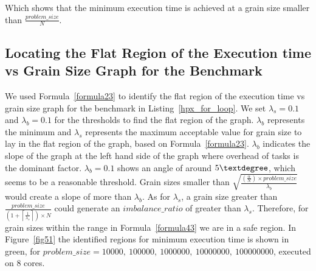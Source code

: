 Which shows that the minimum execution time is achieved at a grain size smaller than $\frac{problem\_{size}}{N}$.
 

\subsection{Locating the Flat Region of the Execution time vs Grain Size Graph for the Benchmark}

We used Formula~\ref{formula23} to identify the flat region of the execution time vs grain size graph for the benchmark in Listing~\ref{hpx_for_loop}. We set $\lambda_{s}=0.1$ and $\lambda_{b}=0.1$ for the thresholds to find the flat region of the graph. $\lambda_{b}$ represents the minimum and $\lambda_{s}$ represents the maximum acceptable value for grain size to lay in the flat region of the graph, based on Formula~\ref{formula23}. $\lambda_{b}$ indicates the slope of the graph at the left hand side of the graph where overhead of tasks is the dominant factor. $\lambda_{b}=0.1$ shows an angle of around $5\textdegree$, which seems to be a reasonable threshold. Grain sizes smaller than $\sqrt{\frac{(\frac{\alpha}{N})\times{problem\_{size}}}{{\lambda_b}}}$ would create a slope of more than $\lambda_b$. As for $\lambda_s$, a grain size greater than       
$\frac{problem\_{size}}{(1+\left\lceil{\frac{1}{\lambda_s}}\right\rceil)\times{N}}$ could generate an $imbalance\_{ratio}$ of greater than $\lambda_s$. Therefore, for grain sizes within the range in Formula~\ref{formula43} we are in a safe region. 
In Figure~\ref{fig51} the identified regions for minimum execution time is shown in green, for $problem\_{size}=10000,\:100000,\:1000000,\:10000000,\:100000000$, executed on $8$ cores. 


